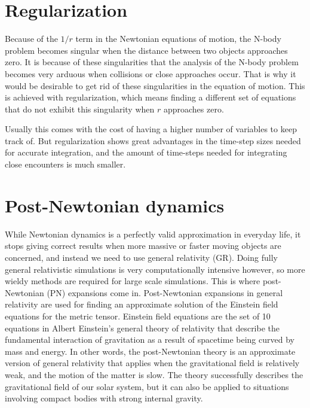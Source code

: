 \documentclass[english, oneside]{HYgradu}
\begin{document}

\section{Regularization}

Because of the $1/r$ term in the Newtonian equations of motion, the N-body problem becomes singular when the distance between two objects approaches zero. It is because of these singularities that the analysis of the N-body problem becomes very arduous when collisions or close approaches occur. That is why it would be desirable to get rid of these singularities in the equation of motion. This is achieved with regularization, which means finding a different set of equations that do not exhibit this singularity when $r$ approaches zero.

Usually this comes with the cost of having a higher number of variables to keep track of. But regularization shows great advantages in the time-step sizes needed for accurate integration, and the amount of time-steps needed for integrating close encounters is much smaller. 

\section{Post-Newtonian dynamics} \label{sect:pndynam}

While Newtonian dynamics is a perfectly valid approximation in everyday life, it stops giving correct results when more massive or faster moving objects are concerned, and instead we need to use general relativity (GR). %
Doing fully general relativistic simulations is very computationally intensive however, so more wieldy methods are required for large scale simulations. This is where post-Newtonian (PN) expansions come in. Post-Newtonian expansions in general relativity are used for finding an approximate solution of the Einstein field equations for the metric tensor. %
Einstein field equations are the set of 10 equations in Albert Einstein's general theory of relativity that describe the fundamental interaction of gravitation as a result of spacetime being curved by mass and energy.
In other words, the post-Newtonian theory is an approximate version of general relativity that applies when the gravitational field is relatively weak, and the motion of the matter is slow. The theory successfully describes the gravitational field of our solar system, but it can also be applied to situations involving compact bodies with strong internal gravity.
\end{document}
